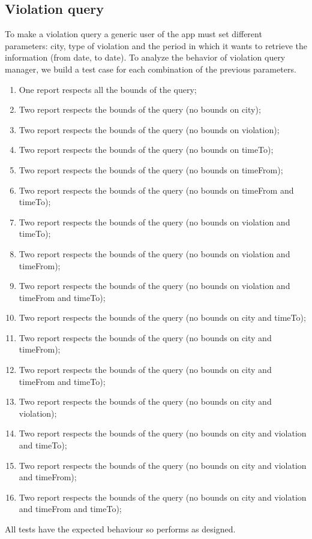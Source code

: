 \documentclass[../ITD.tex]{subfiles}
\begin{document}
    \subsection{Violation query}\label{subsec:violation-query}
    To make a violation query a generic user of the app must set different parameters: city, type of violation and the period in which it wants to retrieve the information (from date, to date).
    To analyze the behavior of violation query manager, we build a test case for each combination of the previous parameters.
    \begin{enumerate}
        \item One report respects all the bounds of the query;
        \item Two report respects the bounds of the query (no bounds on city);
        \item Two report respects the bounds of the query (no bounds on violation);
        \item Two report respects the bounds of the query (no bounds on timeTo);
        \item Two report respects the bounds of the query (no bounds on timeFrom);
        \item Two report respects the bounds of the query (no bounds on timeFrom and timeTo);
        \item Two report respects the bounds of the query (no bounds on violation and timeTo);
        \item Two report respects the bounds of the query (no bounds on violation and timeFrom);
        \item Two report respects the bounds of the query (no bounds on violation and timeFrom and timeTo);
        \item Two report respects the bounds of the query (no bounds on city and timeTo);
        \item Two report respects the bounds of the query (no bounds on city and timeFrom);
        \item Two report respects the bounds of the query (no bounds on city and timeFrom and timeTo);
        \item Two report respects the bounds of the query (no bounds on city and violation);
        \item Two report respects the bounds of the query (no bounds on city and violation and timeTo);
        \item Two report respects the bounds of the query (no bounds on city and violation and timeFrom);
        \item Two report respects the bounds of the query (no bounds on city and violation and timeFrom and timeTo);
    \end{enumerate}
    All tests have the expected behaviour so performs as designed.
\end{document}
